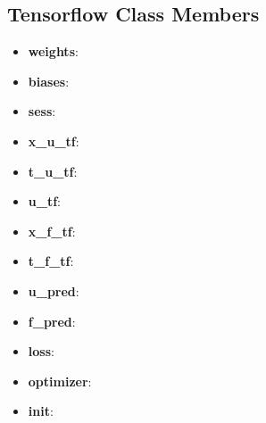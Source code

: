 \documentclass[10pt]{article}
\begin{document}
\subsection{Tensorflow Class Members}

\begin{itemize}
	\item \textbf{weights}:
	\item \textbf{biases}:
	\item \textbf{sess}:
	\item \textbf{x\_u\_tf}:
	\item \textbf{t\_u\_tf}:
	\item \textbf{u\_tf}:
	\item \textbf{x\_f\_tf}:
	\item \textbf{t\_f\_tf}:
	\item \textbf{u\_pred}:
	\item \textbf{f\_pred}:
	\item \textbf{loss}:
	\item \textbf{optimizer}:
	\item \textbf{init}: 
\end{itemize}	
	
	
	
	
	
	
\nocite{*}
{}

\end{document}
